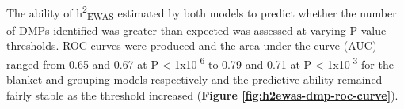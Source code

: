 \documentclass[11pt,oneside]{bristolthesis}
\begin{document}
\begin{table}[!h]

\caption{\label{tab:model-testing-tab}Summary of how well models fit to test the association between $h^2_{EWAS}$ and the number of differentially methylated positions identified across 400 traits at P < 1x10$^{-5}$.}
\centering
{}
\end{table}
The ability of h\textsuperscript{2}\textsubscript{EWAS} estimated by both models to predict whether the number of DMPs identified was greater than expected was assessed at varying P value thresholds. ROC curves were produced and the area under the curve (AUC) ranged from 0.65 and 0.67 at P \textless{} 1x10\textsuperscript{-6} to 0.79 and 0.71 at P \textless{} 1x10\textsuperscript{-3} for the blanket and grouping models respectively and the predictive ability remained fairly stable as the threshold increased (\textbf{Figure \ref{fig:h2ewas-dmp-roc-curve}}).
\end{document}
